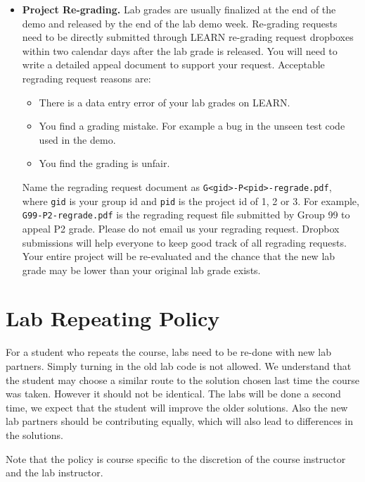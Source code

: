 \begin{itemize}
    \item {\bf Project Re-grading.}
        Lab grades are usually finalized at the end of the demo and released by the end of the lab demo week. Re-grading requests need to be directly submitted through LEARN re-grading request dropboxes within two calendar days after the lab grade is released. You will need to write a detailed appeal document to support your request. Acceptable regrading request reasons are:
      \begin{itemize}
          \item There is a data entry error of your lab grades on LEARN.
          \item You find a grading mistake. For example a bug in the unseen test code used in the demo.
          \item You find the grading is unfair.
      \end{itemize}
          Name the regrading request document as \verb+G<gid>-P<pid>-regrade.pdf+, where \verb+gid+ is your group id and \verb+pid+ is the project id of 1, 2 or 3.
          For example, \verb+G99-P2-regrade.pdf+ is the regrading request file submitted by Group 99 to appeal P2 grade.
          Please do not email us your regrading request. Dropbox submissions will help everyone to keep good track of all regrading requests.
          Your entire project will be re-evaluated and the chance that the new lab grade may be lower than your original lab grade exists.
    \end{itemize}

\section*{Lab Repeating Policy}
For a student who repeats the course, labs need to be re-done with new lab partners. 
Simply turning in the old lab code is not allowed. 
We understand that the student may choose a similar route to the solution chosen last time 
the course was taken. However it should not be identical. The labs will be done a second time,
we expect that the student will improve the older solutions. Also the new lab partners should be 
contributing equally, which will also lead to differences in the solutions. 

Note that the policy is course specific to the discretion of the course instructor and the lab instructor.

